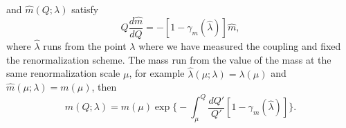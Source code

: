 and $\hat{m}(Q;\lambda)$ satisfy 
\begin{equation}
    Q\frac{d\hat{m}}{dQ} = -[1 - \gamma_m(\hat{\lambda})]\hat{m},
\end{equation}
where $\hat{\lambda}$ runs from the point $\lambda$ where we have measured the coupling and fixed the renormalization scheme. The mass run from the value of the mass at the same renormalization scale $\mu$, for example $\hat{\lambda}(\mu;\lambda) = \lambda(\mu)$ and $\hat{m}(\mu;\lambda) = m(\mu)$, then
\begin{equation}
    \hat{m}(Q;\lambda) = m(\mu)\exp{\bigg\{-\int_\mu^Q\frac{dQ'}{Q'}[1 - \gamma_m(\hat{\lambda})]\bigg\}}.
\end{equation}